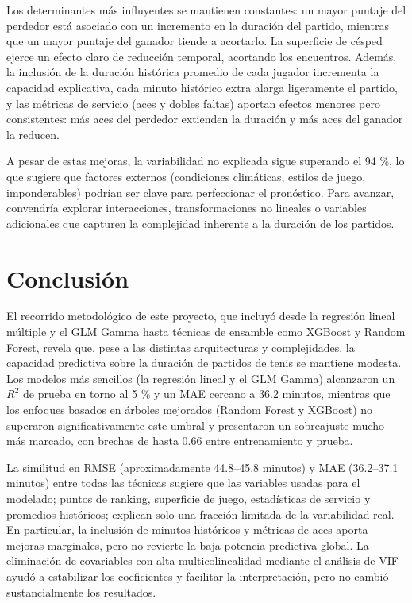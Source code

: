 \documentclass[
  letterpaper,
  DIV=11,
  numbers=noendperiod]{scrartcl}
\begin{document}
Los determinantes más influyentes se mantienen constantes: un mayor
puntaje del perdedor está asociado con un incremento en la duración del
partido, mientras que un mayor puntaje del ganador tiende a acortarlo.
La superficie de césped ejerce un efecto claro de reducción temporal,
acortando los encuentros. Además, la inclusión de la duración histórica
promedio de cada jugador incrementa la capacidad explicativa, cada
minuto histórico extra alarga ligeramente el partido, y las métricas de
servicio (aces y dobles faltas) aportan efectos menores pero
consistentes: más aces del perdedor extienden la duración y más aces del
ganador la reducen.

A pesar de estas mejoras, la variabilidad no explicada sigue superando
el 94 \%, lo que sugiere que factores externos (condiciones climáticas,
estilos de juego, imponderables) podrían ser clave para perfeccionar el
pronóstico. Para avanzar, convendría explorar interacciones,
transformaciones no lineales o variables adicionales que capturen la
complejidad inherente a la duración de los partidos.

\hypertarget{conclusiuxf3n}{%
\section{Conclusión}\label{conclusiuxf3n}}

El recorrido metodológico de este proyecto, que incluyó desde la
regresión lineal múltiple y el GLM Gamma hasta técnicas de ensamble como
XGBoost y Random Forest, revela que, pese a las distintas arquitecturas
y complejidades, la capacidad predictiva sobre la duración de partidos
de tenis se mantiene modesta. Los modelos más sencillos (la regresión
lineal y el GLM Gamma) alcanzaron un \(R^2\) de prueba en torno al 5 \%
y un MAE cercano a 36.2 minutos, mientras que los enfoques basados en
árboles mejorados (Random Forest y XGBoost) no superaron
significativamente este umbral y presentaron un sobreajuste mucho más
marcado, con brechas de hasta 0.66 entre entrenamiento y prueba.

La similitud en RMSE (aproximadamente 44.8--45.8 minutos) y MAE
(36.2--37.1 minutos) entre todas las técnicas sugiere que las variables
usadas para el modelado; puntos de ranking, superficie de juego,
estadísticas de servicio y promedios históricos; explican solo una
fracción limitada de la variabilidad real. En particular, la inclusión
de minutos históricos y métricas de aces aporta mejoras marginales, pero
no revierte la baja potencia predictiva global. La eliminación de
covariables con alta multicolinealidad mediante el análisis de VIF ayudó
a estabilizar los coeficientes y facilitar la interpretación, pero no
cambió sustancialmente los resultados.
\end{document}

